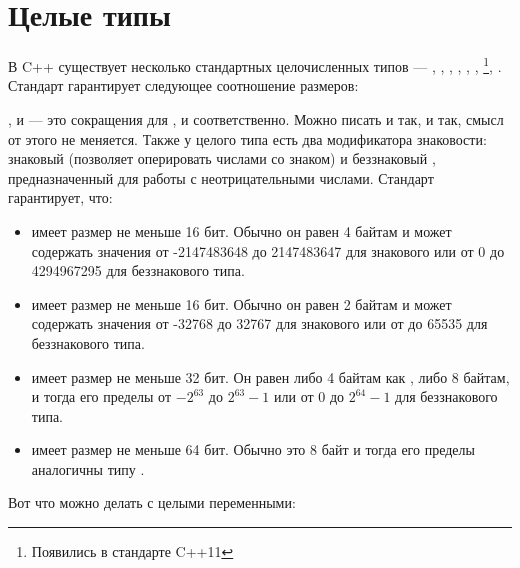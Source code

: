 \documentclass[book.tex]{subfiles}
\begin{document}
\section*{Целые типы}

В C++ существует несколько стандартных целочисленных типов --- , , , , , , \footnote[1]{Появились в стандарте C++11}, \footnotemark[1]. Стандарт гарантирует следующее соотношение размеров:


,  и  --- это сокращения для ,  и  соответственно. Можно писать и так, и так, смысл от этого не меняется. Также у целого типа есть два модификатора знаковости: знаковый  (позволяет оперировать числами со знаком) и беззнаковый , предназначенный для работы с неотрицательными числами. Стандарт гарантирует, что:

\begin{itemize}
\item {} имеет размер не меньше 16 бит. Обычно он равен 4 байтам и может содержать значения от -2147483648 до 2147483647 для знакового или от 0 до 4294967295 для беззнакового типа.
\item {} имеет размер не меньше 16 бит. Обычно он равен 2 байтам и может содержать значения от -32768 до 32767 для знакового или от до 65535 для беззнакового типа.
\item {} имеет размер не меньше 32 бит. Он равен либо 4 байтам как , либо 8 байтам, и тогда его пределы от $-2^{63}$ до $2^{63} - 1$ или от 0 до $2^{64} - 1$ для беззнакового типа.
\item {} имеет размер не меньше 64 бит. Обычно это 8 байт и тогда его пределы аналогичны типу .
\end{itemize}


Вот что можно делать с целыми переменными:

\end{document}
